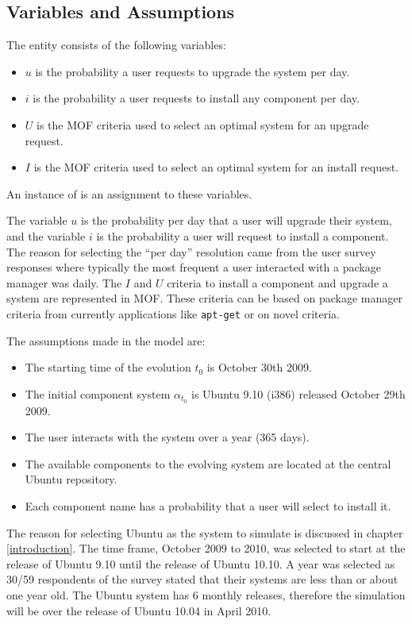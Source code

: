 \subsection{Variables and Assumptions}
The \usermodel entity consists of the following variables: 
\begin{itemize}
  \item $u$ is the probability a user requests to upgrade the system per day.
  \item $i$ is the probability a user requests to install any component per day.
  \item $U$ is the MOF criteria used to select an optimal system for an upgrade request.
  \item $I$ is the MOF criteria used to select an optimal system for an install request.
\end{itemize}
An instance of \usermodel is an assignment to these variables.

The variable $u$ is the probability per day that a user will upgrade their system, and the variable $i$ is the probability a user will request to install a component.
The reason for selecting the ``per day'' resolution came from the user survey responses where typically the most frequent a user interacted with a package manager was daily.
The $I$ and $U$ criteria to install a component and upgrade a system are represented in MOF.
These criteria can be based on package manager criteria from currently applications like \texttt{apt-get} or on novel criteria.

The assumptions made in the \usermodel model are:
\begin{itemize}
  \item The starting time of the evolution $t_0$ is October 30th 2009.
  \item The initial component system $\alpha_{t_0}$ is Ubuntu 9.10 (i386) released October 29th 2009.
  \item The user interacts with the system over a year (365 days).
  \item The available components to the evolving system are located at the central Ubuntu repository.
  \item Each component name has a probability that a user will select to install it. 
\end{itemize}

The reason for selecting Ubuntu as the system to simulate is discussed in chapter \ref{introduction}.
The time frame, October 2009 to 2010, was selected to start at the release of Ubuntu 9.10 until the release of Ubuntu 10.10.
A year was selected as 30/59 respondents of the survey stated that their systems are less than or about one year old.
The Ubuntu system has 6 monthly releases, therefore the simulation will be over the release of Ubuntu 10.04 in April 2010.

